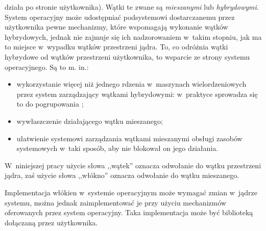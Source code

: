 \documentclass[12pt]{mwart}
\newcounter{figmain}
\newcommand{\myownfigure}[4]{ \newcounter{#1} \setcounter{#1}{\value{figmain}} \addtocounter{figmain}{1} \begin{center} \label{fig:#1} \centering \texttt{[image: \#2]}\\ \nopagebreak[5] \parbox[t]{11.5cm}{Rysunek \arabic{#1}. #3.} \end{center}}
\begin{document}
  działa po stronie użytkownika). Wątki te zwane są \emph{mieszanymi} lub \emph{hybrydowymi}. 
  System operacyjny może udostępniać podsystemowi dostarczanemu przez użytkownika pewne mechanizmy,
  które wspomagają wykonanie wątków hybrydowych, jednak nie zajmuje się ich nadzorowaniem w~takim stopniu, jak ma to miejsce w~wypadku
  wątków przestrzeni jądra. To, co odróżnia wątki hybrydowe od wątków przestrzeni użytkownika, to wsparcie ze strony systemu operacyjnego.
  Są to m. in.:
  \begin{itemize}
    \item wykorzystanie więcej niż jednego rdzenia w~maszynach wielordzeniowych przez system zarządzający wątkami hybrydowymi: w~praktyce sprowadza się to do
      pogrupowania ;
    \item wywłaszczenie działającego wątku mieszanego;
    \item ułatwienie systemowi zarządzania wątkami mieszanymi obsługi zasobów systemowych w~taki sposób, aby nie blokował on jego działania.
  \end{itemize}
\par
%
\indent
  W~niniejszej pracy użycie słowa ,,wątek'' oznacza odwołanie do wątku przestrzeni jądra, zaś użycie słowa ,,włókno'' oznacza odwołanie
  do wątku mieszanego.
\par
%
\begin{comment}
\indent
  \myownfigure{mixedintro}{mixedscheme.png}{Włókna w~implementacji nie wymagającej zmian w~systemie~operacyjnym -- cel niniejszej pracy}{.23}
\par
\end{comment}
\indent
  Implementacja włókien w~systemie operacyjnym może wymagać zmian w~jądrze systemu,
  można jednak zaimplementować je przy użyciu mechanizmów oferowanych przez system operacyjny.
  Taka implementacja może być biblioteką dołączaną przez użytkownika.
\par
%
\end{document}
